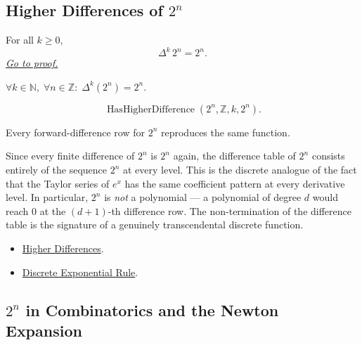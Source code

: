 \subsection*{\texorpdfstring{Higher Differences of \(2^n\)}{Higher Differences of 2 to the n}}

\begin{proposition}
\label{prop:higher-diff-two-n}
For all \(k \ge 0\),
\[
\Delta^k\, 2^n = 2^n.
\]
\hyperref[prf:higher-diff-two-n]{\textit{Go to proof.}}
\end{proposition}

\begin{remark*}
\(\forall k \in \mathbb{N},\; \forall n \in \mathbb{Z}:\; \Delta^k(2^n) = 2^n\).
\end{remark*}

\begin{remark*}
\[
\operatorname{HasHigherDifference}(2^n,\mathbb Z,k,2^n).
\]
\end{remark*}

\begin{remark*}[Interpretation]
Every forward-difference row for \(2^n\) reproduces the same function.


Since every finite difference of \(2^n\) is \(2^n\) again, the difference
table of \(2^n\) consists entirely of the sequence \(2^n\) at every level.
This is the discrete analogue of the fact that the Taylor series of \(e^x\)
has the same coefficient pattern at every derivative level. In particular,
\(2^n\) is \emph{not} a polynomial --- a polynomial of degree \(d\) would
reach \(0\) at the \((d+1)\)-th difference row. The non-termination of
the difference table is the signature of a genuinely transcendental discrete
function.
\end{remark*}


\begin{dependencies}
\begin{itemize}
  \item \hyperref[def:higher-differences]{Higher Differences}.
  \item \hyperref[prop:discrete-exponential-rule]{Discrete Exponential Rule}.
\end{itemize}
\end{dependencies}

\subsection*{\texorpdfstring{\(2^n\) in Combinatorics and the Newton Expansion}{2 to the n in Combinatorics and the Newton Expansion}}

